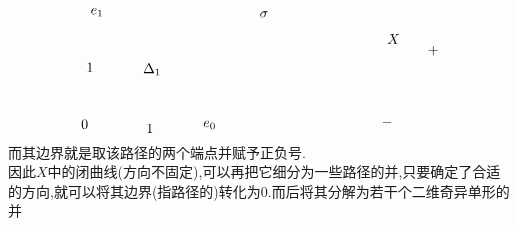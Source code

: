 \documentclass{article}
\begin{document}
\[\begin{tikzpicture}[x=0.75pt,y=0.75pt,yscale=-1,xscale=1]
        \draw (97,254.4) node [anchor=north west][inner sep=0.75pt]    {$0$};
        \draw (102,200.4) node [anchor=north west][inner sep=0.75pt]    {$1$};
        \draw (159,258.43) node [anchor=north west][inner sep=0.75pt]    {$1$};
        \draw (156,200.43) node [anchor=north west][inner sep=0.75pt]    {$\Delta _{1}$};
        \draw (388.42,172.92) node [anchor=north west][inner sep=0.75pt]    {$X$};
        \draw (267,151.29) node [anchor=north west][inner sep=0.75pt]    {$\sigma $};
        \draw (427,184.29) node [anchor=north west][inner sep=0.75pt]    {$+$};
        \draw (383,252.29) node [anchor=north west][inner sep=0.75pt]    {$-$};
        \draw (213.24,255.4) node [anchor=north west][inner sep=0.75pt]    {$e_{0}$};
        \draw (106,148.29) node [anchor=north west][inner sep=0.75pt]    {$e_{1}$};
        
        
        \end{tikzpicture}\]
        而其边界就是取该路径的两个端点并赋予正负号.\\
        因此$X$中的闭曲线(方向不固定),可以再把它细分为一些路径的并,只要确定了合适的方向,就可以将其边界(指路径的)转化为$0$.而后将其分解为若干个二维奇异单形的并
\end{document}
